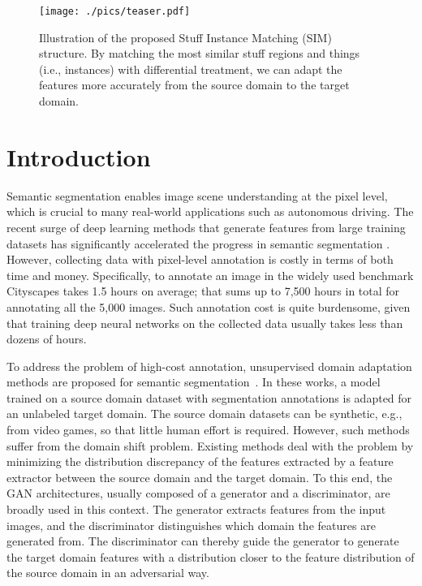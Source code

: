 \documentclass[10pt,twocolumn,letterpaper]{article}
\begin{document}
\vspace{-4mm}
\begin{figure}
\centering
\texttt{[image: ./pics/teaser.pdf]}
\caption{Illustration of the proposed Stuff Instance Matching (SIM) structure. By matching the most similar stuff regions and things (i.e., instances) with differential treatment, we can adapt the features more accurately from the source domain to the target domain. }
\label{teaser}
\vspace{-3mm}
\end{figure}



\section{Introduction}
Semantic segmentation \cite{Long_2015_CVPR} enables image scene understanding at the pixel level, which is crucial to many real-world applications such as autonomous driving. The recent surge of deep learning \cite{deeplearning} methods that generate features from large training datasets has significantly accelerated the progress in semantic segmentation \cite{deeplabv1, deeplabv2, pspnet,deeplabv3,huang2019ccnet,huang2020alignseg,cheng2019spgnet,wei2018revisiting,2019arXiv191110194C,jiao2019geometry,qian2019weakly}. However, collecting data with pixel-level annotation is costly in terms of both time and money. Specifically, to annotate an image in the widely used benchmark Cityscapes \cite{cityscapes} takes 1.5 hours on average; that sums up to 7,500 hours in total for annotating all the 5,000 images. 
Such annotation cost is quite burdensome, given that training deep neural networks on the collected data usually takes less than dozens of hours.

To address the problem of high-cost annotation, unsupervised domain adaptation methods are proposed for semantic segmentation~\cite{gta, synthia}.
In these works, a model trained on a source domain dataset with segmentation annotations is adapted for an unlabeled target domain. The source domain datasets can be synthetic, e.g., from video games, so that little human effort is required.
However, such methods suffer from the domain shift problem. Existing methods deal with the problem by minimizing the distribution discrepancy of the features extracted by a feature extractor \cite{vgg,resnet} between the source domain and the target domain. To this end, the GAN \cite{gan} architectures, usually composed of a generator and a discriminator, are broadly used in this context.
The generator extracts features from the input images, and the discriminator distinguishes which domain the features are generated from. 
The discriminator can thereby guide the generator to generate the target domain features with a distribution closer to the feature distribution of the source domain 
in an adversarial way.
\end{document}
